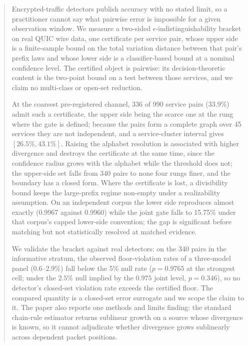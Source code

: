 \begin{abstract}
Encrypted-traffic detectors publish accuracy with no stated limit, so a
practitioner cannot say what pairwise error is impossible for a given
observation window. We measure a two-sided $\epsilon$-indistinguishability
bracket on real QUIC wire data, one certificate per service pair, whose upper
side is a finite-sample bound on the total variation distance between that
pair's prefix laws and whose lower side is a classifier-based bound at a nominal
confidence level. The certified object is pairwise: its decision-theoretic
content is the two-point bound on a test between those services, and we claim no
multi-class or open-set reduction.

At the coarsest pre-registered channel, 336 of 990 service pairs (33.9\%) admit
such a certificate, the upper side being the scarce one at the rung where the
gate is defined; because the pairs form a complete graph over 45 services they
are not independent, and a service-cluster interval gives $[26.5\%, 43.1\%]$.
Raising the alphabet resolution is associated with higher divergence and
destroys the certificate at the same time, since the confidence radius grows with
the alphabet while the threshold does not; the upper-side set falls from 340 pairs
to none four rungs finer, and the boundary has a closed form. Where the
certificate is lost, a divisibility bound keeps the large-prefix regime
non-empty under a realizability assumption. On an independent corpus the lower
side reproduces almost exactly (0.9967 against 0.9960) while the joint gate
falls to 15.75\% under that corpus's capped lower-side convention; the gap is
significant before matching but not statistically resolved at matched evidence.

We validate the bracket against real detectors: on the 340 pairs in the
informative stratum, the observed floor-violation rates of a three-model panel
(0.6--2.9\%) fall below the 5\% null rate ($p = 0.9765$ at the strongest cell;
under the $2.5\%$ null implied by the $0.975$ joint level, $p = 0.346$), so no
detector's closed-set violation rate exceeds the certified floor. The compared
quantity is a closed-set error surrogate and we scope the claim to it. The paper also reports one methods and
limits finding: the standard chain-rule estimator returns sublinear growth on a
source whose divergence is known, so it cannot adjudicate whether divergence
grows sublinearly across dependent packet positions.
\end{abstract}
